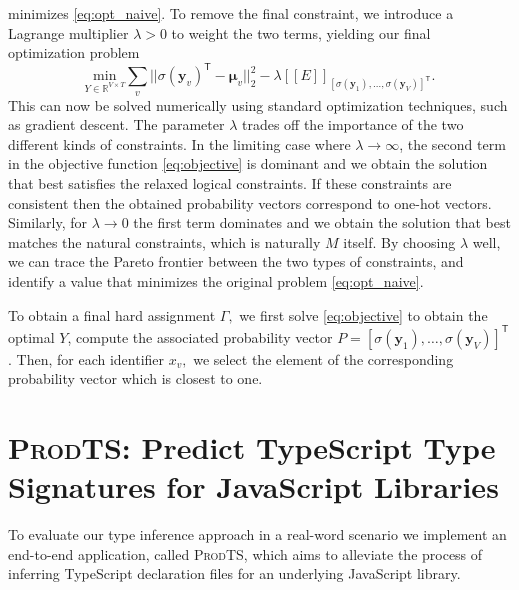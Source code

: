\documentclass[sigplan,10pt,anonymous]{acmart} %
\newcommand{\qqpi}[2]{[\![#2]\!]_{#1}}
\newcommand{\prodts}{\textsc{ProdTS}\xspace}
\theoremstyle{plain}
\theoremstyle{remark}
\theoremstyle{definition}
\begin{document}
minimizes \eqref{eq:opt_naive}. To remove the final constraint,
we introduce a Lagrange multiplier $\lambda > 0$ to weight
the two terms, yielding our final optimization problem
\begin{equation}\label{eq:objective}
  \underset{Y \in \mathbb{R}^{V \times T}}{\mathrm{min}}
  \sum_v || \sigma(\bm{y}_v)^\mathsf{T} - \bm{\mu}_v ||_2^2
  - \lambda \qqpi{[\sigma(\bm{y}_1), \ldots, \sigma(\bm{y}_{V})]^\mathsf{T}}{E}.
\end{equation}
This can now be solved numerically using standard optimization
techniques, such as gradient descent.
The parameter $\lambda$ trades off the importance
of the two different kinds of constraints.
In the limiting case where $\lambda \rightarrow \infty$, the second term in the objective function \eqref{eq:objective} is dominant and we obtain the solution that best satisfies the relaxed
logical constraints.
If these constraints are consistent then the obtained probability vectors correspond to one-hot vectors.
Similarly, for $\lambda \rightarrow 0$ the first term dominates and we obtain the solution that best matches the natural constraints,
which is naturally $M$ itself. By choosing $\lambda$ well,
we can trace the Pareto frontier between the two types of constraints,
and identify a value that minimizes the original problem \eqref{eq:opt_naive}.

To obtain a final hard assignment $\Gamma,$ we first solve \eqref{eq:objective} to obtain the optimal $Y$, compute the
associated probability vector $P = [\sigma(\bm{y}_1), \ldots, \sigma(\bm{y}_{V})]^\mathsf{T}$. Then, for each identifier $x_v,$
we select the element of the
corresponding probability vector which is closest to one.

\section{\prodts: Predict TypeScript Type Signatures for JavaScript Libraries}
\label{sec:prodts}
To evaluate our type inference approach in a real-word scenario we
implement an end-to-end application, called \prodts, which aims
to alleviate the process of inferring TypeScript declaration files
for an underlying JavaScript library.
\end{document}

